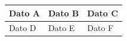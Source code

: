 \documentclass{article}
\begin{document}
\begin{table}[h!]
\centering
\setlength{\tabcolsep}{5pt}
\begin{tabular}{p{3cm}p{3cm}p{3cm}}
\hline
\rule{0pt}{1.5cm} Dato A & Dato B & Dato C \\
\hline
\rule{0pt}{1.5cm} Dato D & Dato E & Dato F \\
\hline
\end{tabular}
\end{table}
\end{document}
